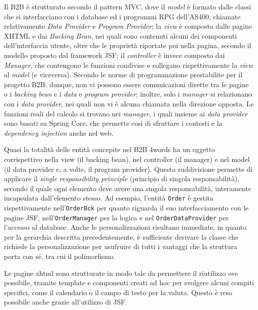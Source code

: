 Il B2B è strutturato secondo il pattern \Gls{MVC}, dove il \textit{model} è formato dalle classi che si interfacciano con i database ed i programmi \Gls{RPG} dell'\Gls{AS400}, chiamate relativamente \textit{Data Provider} e \textit{Program Provider}; la \textit{view} è composta dalle pagine \Gls{XHTML} e dai \textit{Backing Bean}, nei quali sono contenuti alcuni dei componenti dell'interfaccia utente, oltre che le proprietà riportate poi nella pagina, secondo il modello proposto dal \gls{framework} \Gls{JSF}; il \textit{controller} è invece composto dai \textit{Manager}, che contengono le funzioni condivise e collegano rispettivamente la \textit{view} al \textit{model} (e viceversa). Secondo le norme di programmazione prestabilite per il progetto B2B, dunque, non vi possono essere comunicazioni dirette tra le pagine o i \textit{backing bean} e i \textit{data} e \textit{program provider}; inoltre, solo i \textit{manager} si relazionano con i \textit{data provider}, nei quali non vi è alcuna chiamata nella direzione opposta. Le funzioni reali del calcolo si trovano nei \textit{manager}, i quali insieme ai \textit{data provider} sono basati su \Gls{Spring Core}, che permette così di sfruttare i contesti e la \textit{dependency injection} anche nel web. 

Quasi la totalità delle entità concepite nel B2B 4words ha un oggetto corrispettivo nella view (il backing bean), nel controller (il manager) e nel model (il data provider e, a volte, il program provider). Questa suddivisione permette di applicare il \textit{single responsibility principle} (principio di singola responsabilità), secondo il quale ogni elemento deve avere una singola responsabilità, interamente incapsulata dall'elemento stesso. Ad esempio, l'entità \texttt{Order} è gestita rispettivamente nell'\texttt{OrderBck} per quanto riguarda il suo interfacciamento con le pagine JSF, nell'\texttt{OrderManager} per la logica e nel \texttt{OrderDataProvider} per l'accesso al database. Anche le personalizzazioni risultano immediate, in quanto per la gerarchia descritta precedentemente, è sufficiente derivare la classe che richiede la personalizzazione per usufruire di tutti i vantaggi che la struttura porta con sé, tra cui il polimorfismo.

Le pagine xhtml sono strutturate in modo tale da permettere il riutilizzo ove possibile, tramite template e componenti creati ad hoc per svolgere alcuni compiti specifici, come il calendario o il campo di testo per la valuta. Questo è reso possibile anche grazie all'utilizzo di JSF.

